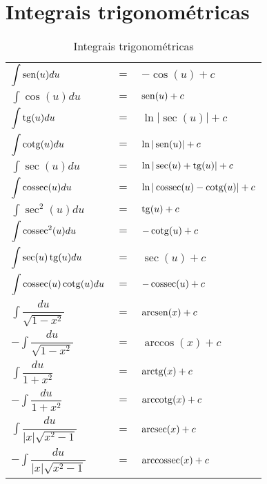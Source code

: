 \section{Integrais trigonométricas}
	\begin{table}[H]
		\caption{Integrais trigonométricas}
		\label{integrais_trigonometricas}
		\centering
		\begin{tabular}{|lcl|}
			$\displaystyle\int \operatorname{sen}(u)du$                      & $=$ & $-\cos(u) + c$                   \\
			$\displaystyle\int \cos(u)du$                      & $=$ & $\operatorname{sen}(u) + c$                    \\
			$\displaystyle\int \operatorname{tg}(u)du$                       & $=$ & $\ln|\sec(u)| + c$               \\
			$\displaystyle\int \operatorname{cotg}(u)du$                     & $=$ & $\ln|\operatorname{sen}(u)| + c$               \\
			$\displaystyle\int \sec(u)du$                      & $=$ & $\ln|\sec(u) + \operatorname{tg}(u)| + c$      \\
			$\displaystyle\int \operatorname{cossec}(u)du$                   & $=$ & $\ln|\operatorname{cossec}(u) - \operatorname{cotg}(u)| + c$ \\
			$\displaystyle\int \sec^2(u)du$                    & $=$ & $\operatorname{tg}(u) + c$                     \\
			$\displaystyle\int \operatorname{cossec}^2(u)du$                 & $=$ & $-\operatorname{cotg}(u) + c$                  \\
			$\displaystyle\int \sec(u)\operatorname{tg}(u)du$                & $=$ & $\sec(u) + c$                    \\
			$\displaystyle\int \operatorname{cossec}(u)\operatorname{cotg}(u)du$           & $=$ & $-\operatorname{cossec}(u) + c$                \\
			$\displaystyle\int \dfrac{du}{\sqrt{1 - x^2}}$     & $=$ & $\operatorname{arcsen}(x) + c$                 \\
			$-\displaystyle\int \dfrac{du}{\sqrt{1 - x^2}}$    & $=$ & $\arccos(x) + c$                 \\
			$\displaystyle\int \dfrac{du}{1 + x^2}$            & $=$ & $\operatorname{arctg}(x) + c$                  \\
			$-\displaystyle\int \dfrac{du}{1 + x^2}$           & $=$ & $\operatorname{arccotg}(x) + c$                \\
			$\displaystyle\int \dfrac{du}{|x|\sqrt{x^2 - 1}}$  & $=$ & $\operatorname{arcsec}(x) + c$                 \\
			$-\displaystyle\int \dfrac{du}{|x|\sqrt{x^2 - 1}}$ & $=$ & $\operatorname{arccossec}(x) + c$
		\end{tabular}		
	\end{table}

